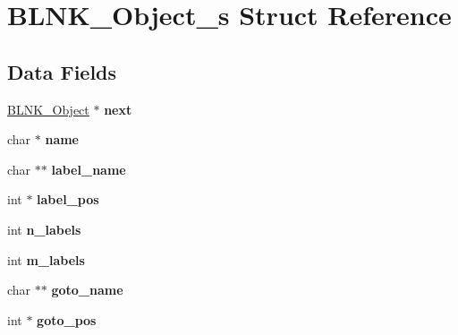 \hypertarget{structBLNK__Object__s}{\section{B\-L\-N\-K\-\_\-\-Object\-\_\-s Struct Reference}
\label{structBLNK__Object__s}
}
\subsection*{Data Fields}
\begin{DoxyCompactItemize}
\item 
\hypertarget{structBLNK__Object__s_af0347fac5a59a3af25637a9375f2ab0e}{\hyperlink{structBLNK__Object__s}{B\-L\-N\-K\-\_\-\-Object} $\ast$ {\bfseries next}}\label{structBLNK__Object__s_af0347fac5a59a3af25637a9375f2ab0e}

\item 
\hypertarget{structBLNK__Object__s_a6250da09dfd921d263dde3cbfe2c38e3}{char $\ast$ {\bfseries name}}\label{structBLNK__Object__s_a6250da09dfd921d263dde3cbfe2c38e3}

\item 
\hypertarget{structBLNK__Object__s_ab4c3b6f3283835700354dbc12762dc74}{char $\ast$$\ast$ {\bfseries label\-\_\-name}}\label{structBLNK__Object__s_ab4c3b6f3283835700354dbc12762dc74}

\item 
\hypertarget{structBLNK__Object__s_ab9bcdd3d6193db07f523f11bc4e19eba}{int $\ast$ {\bfseries label\-\_\-pos}}\label{structBLNK__Object__s_ab9bcdd3d6193db07f523f11bc4e19eba}

\item 
\hypertarget{structBLNK__Object__s_a18ce10f9b1414a5eee5585eee7d10f51}{int {\bfseries n\-\_\-labels}}\label{structBLNK__Object__s_a18ce10f9b1414a5eee5585eee7d10f51}

\item 
\hypertarget{structBLNK__Object__s_a30d80d92c50e1904388db933ff845fc7}{int {\bfseries m\-\_\-labels}}\label{structBLNK__Object__s_a30d80d92c50e1904388db933ff845fc7}

\item 
\hypertarget{structBLNK__Object__s_a60c0c5ee145e60a842ad6f5c9b1f1ec5}{char $\ast$$\ast$ {\bfseries goto\-\_\-name}}\label{structBLNK__Object__s_a60c0c5ee145e60a842ad6f5c9b1f1ec5}

\item 
\hypertarget{structBLNK__Object__s_a51b60221b48d9dc19d66c8eb69fd88f0}{int $\ast$ {\bfseries goto\-\_\-pos}}\label{structBLNK__Object__s_a51b60221b48d9dc19d66c8eb69fd88f0}


\end{DoxyCompactItemize}
